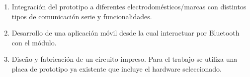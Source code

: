 \begin{enumerate}
	\item Integración del prototipo a diferentes electrodomésticos/marcas con distintos tipos de
comunicación serie y funcionalidades.
	\item Desarrollo de una aplicación móvil desde la cual interactuar por Bluetooth con el módulo.
	\item Diseño y fabricación de un circuito impreso. Para el trabajo se utiliza una placa de prototipo ya existente que incluye el hardware seleccionado.
\end{enumerate}






















 